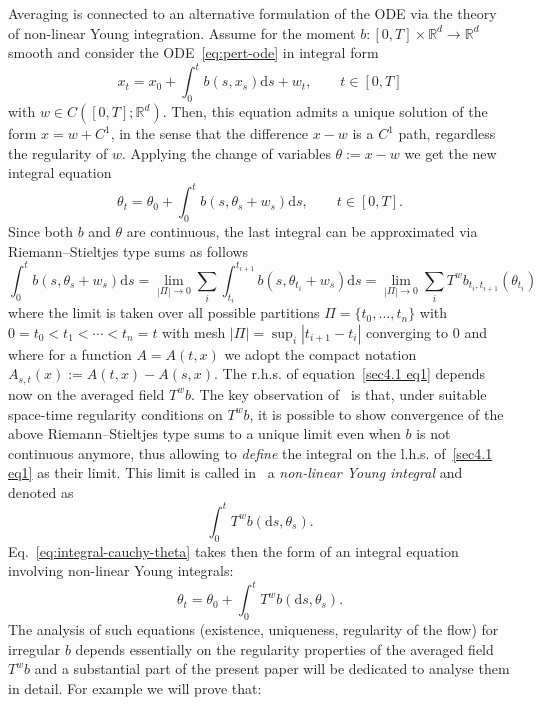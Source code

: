 \documentclass[10pt]{article}
\newcommand{\assign}{:=}
\newcommand{\mathd}{\mathrm{d}}
\newcommand{\tmtextit}[1]{{\itshape{#1}}}
\begin{document}
Averaging is connected to an alternative formulation of the ODE via the
theory of non-linear Young integration. Assume for the moment $b : [0, T]
\times \mathbb{R}^d \rightarrow \mathbb{R}^d$ smooth and consider the
ODE~{\eqref{eq:pert-ode}} in integral form
\begin{equation}
  x_t = x_0 + \int_0^t b (s, x_s) \mathd s + w_t \label{eq:integral-cauchy},
  \qquad t \in [0, T]
\end{equation}
with $w \in C ([0, T] ; \mathbb{R}^d)$. Then, this equation admits a unique
solution of the form $x = w + C^1$, in the sense that the difference $x - w$
is a $C^1$ path, regardless the regularity of $w$. Applying the change of
variables $\theta \assign x - w$ we get the new integral equation
\begin{equation}
  \theta_t = \theta_0 + \int_0^t b (s, \theta_s + w_s) \mathd s, \qquad t \in
  [0, T] . \label{eq:integral-cauchy-theta}
\end{equation}
Since both $b$ and $\theta$ are continuous, the last integral can be
approximated via Riemann--Stieltjes type sums as follows
\begin{equation}
  \int_0^t b (s, \theta_s + w_s) \mathd s = \lim_{| \Pi | \rightarrow 0}
  \sum_i \int_{t_i}^{t_{i + 1}} b (s, \theta_{t_i} + w_s) \mathd s = \lim_{|
  \Pi | \rightarrow 0} \sum_i T^w b_{t_i, t_{i + 1}} (\theta_{t_i})
  \label{sec4.1 eq1}
\end{equation}
where the limit is taken over all possible partitions $\Pi = \{ t_0, \ldots,
t_n \}$ with $0 = t_0 < t_1 < \cdots < t_n = t$ with mesh $| \Pi | = \sup_i |
t_{i + 1} - t_i |$ converging to $0$ and where for a function $A = A (t, x)$
we adopt the compact notation $A_{s, t} (x) \assign A (t, x) - A (s, x)$. The
r.h.s. of equation~{\eqref{sec4.1 eq1}} depends now on the averaged field $T^w
b$. The key observation of~{\cite{catelliergubinelli}} is that, under suitable
space-time regularity conditions on $T^w b$, it is possible to show
convergence of the above Riemann--Stieltjes type sums to a unique limit even
when $b$ is not continuous anymore, thus allowing to \tmtextit{define} the
integral on the l.h.s. of~{\eqref{sec4.1 eq1}} as their limit. This limit is
called in~{\cite{catelliergubinelli}} a \tmtextit{non-linear Young integral}
and denoted as
\[ \int_0^t T^w b (\mathd s, \theta_s) . \]
Eq.~{\eqref{eq:integral-cauchy-theta}} takes then the form of an integral
equation involving non-linear Young integrals:
\[ \theta_t = \theta_0 + \int_0^t T^w b (\mathd s, \theta_s) . \]
The analysis of such equations (existence, uniqueness, regularity of the flow)
for irregular $b$ depends essentially on the regularity properties of the
averaged field $T^w b$ and a substantial part of the present paper will be
dedicated to analyse them in detail. For example we will prove that:
\end{document}
